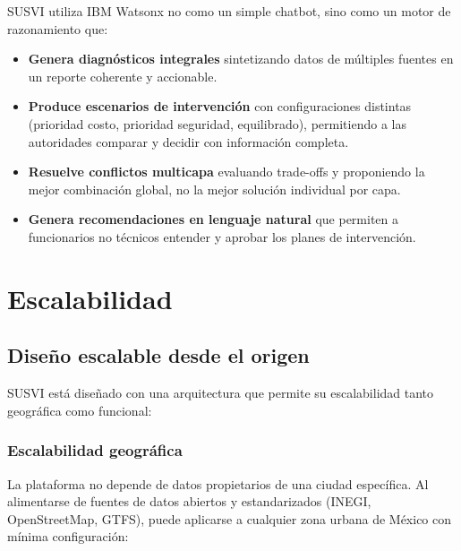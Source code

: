 \documentclass[12pt,a4paper]{article}
\begin{document}
SUSVI utiliza IBM Watsonx no como un simple chatbot, sino como un motor de razonamiento que:

\begin{itemize}[leftmargin=1.5cm]
    \item \textbf{Genera diagnósticos integrales} sintetizando datos de múltiples fuentes en un reporte coherente y accionable.
    \item \textbf{Produce escenarios de intervención} con configuraciones distintas (prioridad costo, prioridad seguridad, equilibrado), permitiendo a las autoridades comparar y decidir con información completa.
    \item \textbf{Resuelve conflictos multicapa} evaluando trade-offs y proponiendo la mejor combinación global, no la mejor solución individual por capa.
    \item \textbf{Genera recomendaciones en lenguaje natural} que permiten a funcionarios no técnicos entender y aprobar los planes de intervención.
\end{itemize}


\section{Escalabilidad}

\subsection{Diseño escalable desde el origen}

SUSVI está diseñado con una arquitectura que permite su escalabilidad tanto geográfica como funcional:

\subsubsection{Escalabilidad geográfica}

La plataforma no depende de datos propietarios de una ciudad específica. Al alimentarse de fuentes de datos abiertos y estandarizados (INEGI, OpenStreetMap, GTFS), puede aplicarse a cualquier zona urbana de México con mínima configuración:
\end{document}
